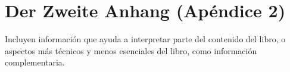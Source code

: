 \chapter{Der Zweite Anhang (Ap\'endice 2)}\label{apendice2}



Incluyen información que ayuda a interpretar parte del contenido del libro, o aspectos más técnicos y menos esenciales del libro, como información complementaria.


\bigskip





\endinput 